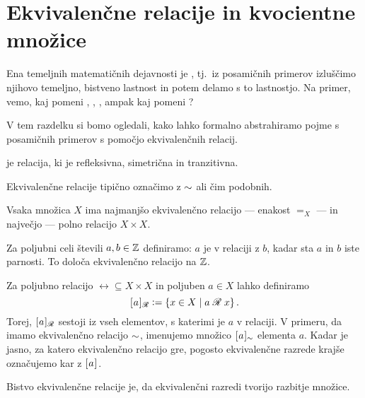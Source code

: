 	
	
	\section{Ekvivalenčne relacije in kvocientne množice}
	
		Ena temeljnih matematičnih dejavnosti je  , tj.~iz posamičnih primerov izluščimo njihovo temeljno, bistveno lastnost in potem delamo s to lastnostjo.  Na primer, vemo, kaj pomeni , , , ampak kaj pomeni ?
		
		V tem razdelku si bomo ogledali, kako lahko formalno abstrahiramo pojme s posamičnih primerov s pomočjo ekvivalenčnih relacij.
		
		\begin{definicija}
			 je relacija, ki je refleksivna, simetrična in tranzitivna.
		\end{definicija}
		
		Ekvivalenčne relacije tipično označimo z $\equ$ ali čim podobnih.
		
		\begin{zgled}
			Vsaka množica $X$ ima najmanjšo ekvivalenčno relacijo --- enakost $=_X$ --- in največjo --- polno relacijo $X \times X$.
		\end{zgled}
		
		\begin{zgled}
			Za poljubni celi števili $a, b \in \ZZ$ definiramo: $a$ je v relaciji z $b$, kadar sta $a$ in $b$ iste parnosti. To določa ekvivalenčno relacijo na $\ZZ$.
		\end{zgled}
		
		Za poljubno relacijo $\rel \subseteq X \times X$ in poljuben $a \in X$ lahko definiramo
		\[\ec[\rel]{a} \dfeq \set{x \in X}{\rel[a][x]}.\]
		Torej, $\ec[\rel]{a}$ sestoji iz vseh elementov, s katerimi je $a$ v relaciji. V primeru, da imamo ekvivalenčno relacijo $\equ$, imenujemo množico $\ec[\equ]{a}$  elementa $a$. Kadar je jasno, za katero ekvivalenčno relacijo gre, pogosto ekvivalenčne razrede krajše označujemo kar z $\ec{a}$.
		
		Bistvo ekvivalenčne relacije je, da ekvivalenčni razredi tvorijo razbitje množice.
		
		
